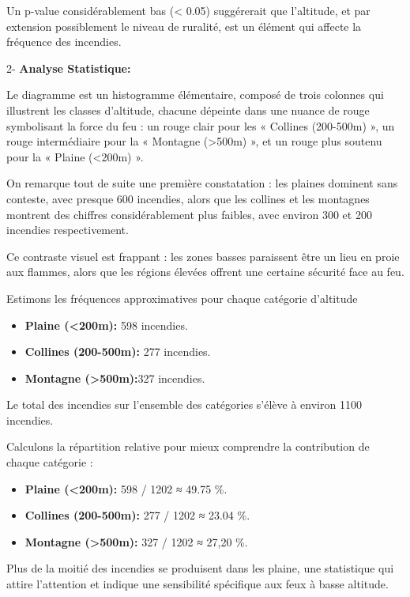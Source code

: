 \documentclass[
]{article}
\providecommand{\tightlist}{%
  \setlength{\itemsep}{0pt}\setlength{\parskip}{0pt}}
\begin{document}
Un p-value considérablement bas (\textless{} 0.05) suggérerait que
l'altitude, et par extension possiblement le niveau de ruralité, est un
élément qui affecte la fréquence des incendies.

2- \textbf{Analyse Statistique:}

Le diagramme est un histogramme élémentaire, composé de trois colonnes
qui illustrent les classes d'altitude, chacune dépeinte dans une nuance
de rouge symbolisant la force du feu : un rouge clair pour les «
Collines (200-500m) », un rouge intermédiaire pour la « Montagne
(\textgreater500m) », et un rouge plus soutenu pour la « Plaine
(\textless200m) ».

On remarque tout de suite une première constatation : les plaines
dominent sans conteste, avec presque 600 incendies, alors que les
collines et les montagnes montrent des chiffres considérablement plus
faibles, avec environ 300 et 200 incendies respectivement.

Ce contraste visuel est frappant : les zones basses paraissent être un
lieu en proie aux flammes, alors que les régions élevées offrent une
certaine sécurité face au feu.

Estimons les fréquences approximatives pour chaque catégorie d'altitude

\begin{itemize}
\tightlist
\item
  \textbf{Plaine (\textless200m):} 598 incendies.
\item
  \textbf{Collines (200-500m):} 277 incendies.
\item
  \textbf{Montagne (\textgreater500m):}327 incendies.
\end{itemize}

Le total des incendies sur l'ensemble des catégories s'élève à environ
1100 incendies.

Calculons la répartition relative pour mieux comprendre la contribution
de chaque catégorie :

\begin{itemize}
\tightlist
\item
  \textbf{Plaine (\textless200m):} 598 / 1202 ≈ 49.75 \%.
\item
  \textbf{Collines (200-500m):} 277 / 1202 ≈ 23.04 \%.
\item
  \textbf{Montagne (\textgreater500m):} 327 / 1202 ≈ 27,20 \%.
\end{itemize}

Plus de la moitié des incendies se produisent dans les plaine, une
statistique qui attire l'attention et indique une sensibilité spécifique
aux feux à basse altitude.
\end{document}
